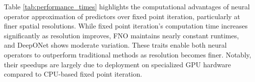 \documentclass[letterpaper, 10 pt, conference]{ieeeconf}  %
\begin{document}
Table \ref{tab:performance_times} highlights the computational advantages of neural operator approximation of predictors over fixed point iteration, particularly at finer spatial resolutions. While fixed point iteration’s computation time increases significantly as resolution improves, FNO maintains nearly constant runtimes, and DeepONet shows moderate variation. These traits enable both neural operators to outperform traditional methods as resolution becomes finer. Notably, their speedups are largely due to deployment on specialized GPU hardware compared to CPU-based fixed point iteration.


\end{document}
